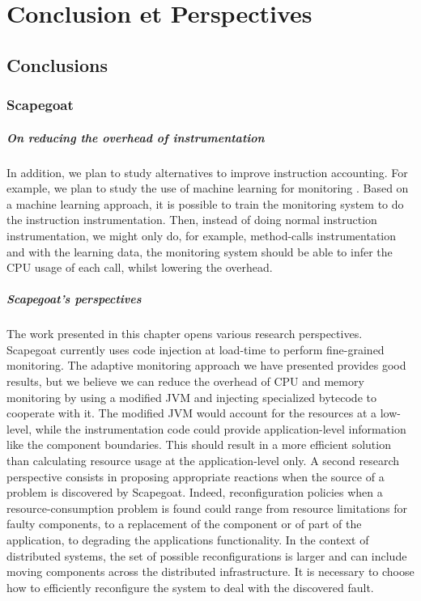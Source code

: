 \chapter{Conclusion et Perspectives}
\label{chap:ccl}

\section{Conclusions}


\subsection{Scapegoat}

\paragraph{On reducing the overhead of instrumentation}
In addition, we plan to study alternatives to improve instruction accounting. %
For example, we plan to study the use of machine learning for monitoring \cite{tesauro2006hybrid}. Based on a machine learning approach, it is possible to train the monitoring system to do the instruction instrumentation. Then, instead of doing normal instruction instrumentation, we might only do, for example, method-calls instrumentation and with the learning data, the monitoring system should be able to infer the CPU usage of each call, whilst lowering the overhead.

\paragraph{Scapegoat's perspectives}
The work presented in this chapter opens various research perspectives. 
Scapegoat currently uses code injection at load-time to perform fine-grained monitoring. 
The adaptive monitoring approach we have presented provides good results, but we believe we can reduce the overhead of CPU and memory monitoring by using a modified JVM and injecting specialized bytecode to cooperate with it.
The modified JVM would account for the resources at a low-level, while the instrumentation code could provide application-level information like the component boundaries. 
This should result in a more efficient solution than calculating resource usage at the application-level only.
A second research perspective consists in proposing appropriate reactions when the source of a problem is discovered by Scapegoat. 
Indeed, reconfiguration policies when a resource-consumption problem is found could range from resource limitations for faulty components, to a replacement of the component or of part of the application, to degrading the applications functionality.
In the context of distributed systems, the set of possible reconfigurations is larger and can include moving components across the distributed infrastructure.
It is necessary to choose how to efficiently reconfigure the system to deal with the discovered fault.

